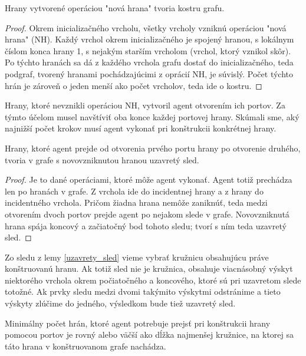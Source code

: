 \begin{lem}
Hrany vytvorené operáciou "nová hrana" tvoria kostru grafu.
\end{lem}
\begin{proof}
Okrem inicializačného vrcholu, všetky vrcholy vzniknú operáciou "nová hrana"
(NH). Každý vrchol okrem inicializačného je spojený hranou, s lokálnym číslom
konca hrany
1, s nejakým starším vrcholom (vrchol, ktorý vznikol skôr). Po týchto hranách 
sa dá
z každého vrchola grafu dostať do inicializačného, teda podgraf, 
tvorený hranami
pochádzajúcimi z oprácií NH, je súvislý. 
Počet týchto hrán je zároveň o jeden menší ako počet
vrcholov, teda ide o kostru.
\end{proof}

Hrany, ktoré nevznikli operáciou NH, vytvoril agent otvorením ich portov. Za
týmto účelom musel navštíviť oba konce každej portovej hrany. Skúmali sme,
aký najnižší počet krokov musí agent vykonať pri konštrukcii konkrétnej
hrany.

\begin{lem}
\label{uzavrety_sled}
Hrany, ktoré agent prejde od otvorenia prvého portu hrany po otvorenie druhého,
tvoria v grafe s novovzniknutou hranou uzavretý sled.
\end{lem}
\begin{proof}
Je to dané operáciami, ktoré môže agent vykonať. Agent totiž prechádza len
po hranách v grafe. Z vrchola ide do incidentnej hrany a z hrany do
incidentného vrchola. Pričom žiadna hrana nemôže zaniknúť, teda medzi otvorením
dvoch portov prejde agent po nejakom slede v grafe. Novovzniknutá hrana
spája koncový a začiatočný bod tohoto sledu; tvorí s ním teda uzavretý sled.
\end{proof}

\begin{pozn}
Zo sledu z lemy \ref{uzavrety_sled} vieme vybrať kružnicu obsahujúcu práve
konštruovanú hranu. Ak totiž sled nie je kružnica, obsahuje viacnásobný
výskyt niektorého vrchola okrem počiatočného a koncového, ktoré sú pri
uzavretom slede totožné. Ak prvky sledu medzi dvomi takýmito výskytmi
odstránime a tieto výskyty zlúčime do jedného, výsledkom bude tiež uzavretý
sled.
\end{pozn}

\begin{lem}
\label{minimum}
Minimálny počet hrán, ktoré agent potrebuje prejsť pri konštrukcii 
hrany pomocou
portov je rovný alebo väčší ako dĺžka najmenšej kružnice, na ktorej sa táto
hrana v konštruovanom grafe nachádza.
\end{lem}

